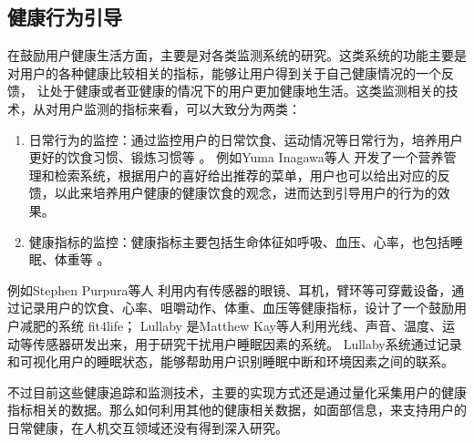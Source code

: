 \subsection{健康行为引导}
在鼓励用户健康生活方面，主要是对各类监测系统的研究。这类系统的功能主要是对用户的各种健康比较相关的指标，能够让用户得到关于自己健康情况的一个反馈，
让处于健康或者亚健康的情况下的用户更加健康地生活。这类监测相关的技术，从对用户监测的指标来看，可以大致分为两类：
\begin{enumerate}

    \item 日常行为的监控：通过监控用户的日常饮食、运动情况等日常行为，培养用户更好的饮食习惯、锻炼习惯等 \cite{purpura2011fit4life,Inagawa2013A,bravata2007using,cordeiro2015barriers,lin2006fish, miller2014stepstream}。 例如Yuma Inagawa等人  \cite{Inagawa2013A} 开发了一个营养管理和检索系统，根据用户的喜好给出推荐的菜单，用户也可以给出对应的反馈，以此来培养用户健康的健康饮食的观念，进而达到引导用户的行为的效果。


    \item 健康指标的监控：健康指标主要包括生命体征如呼吸、血压、心率，也包括睡眠、体重等 \cite{kay2012lullaby,gronvall2013beyond,logan2007mobile,walters2010a}。
    
\end{enumerate}

例如Stephen Purpura等人 \cite{purpura2011fit4life} 利用内有传感器的眼镜、耳机，臂环等可穿戴设备，通过记录用户的饮食、心率、咀嚼动作、体重、血压等健康指标，设计了一个鼓励用户减肥的系统 fit4life； 
Lullaby  \cite{kay2012lullaby} 是Matthew Kay等人利用光线、声音、温度、运动等传感器研发出来，用于研究干扰用户睡眠因素的系统。
Lullaby系统通过记录和可视化用户的睡眠状态，能够帮助用户识别睡眠中断和环境因素之间的联系。 


不过目前这些健康追踪和监测技术，主要的实现方式还是通过量化采集用户的健康指标相关的数据。那么如何利用其他的健康相关数据，如面部信息，来支持用户的日常健康，在人机交互领域还没有得到深入研究。



